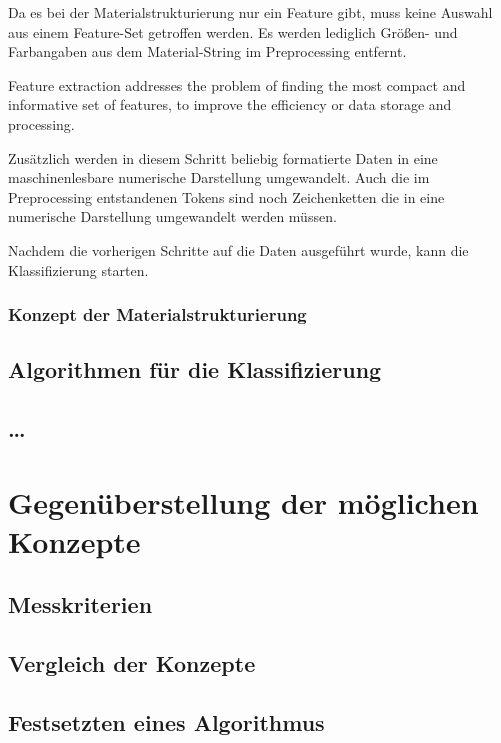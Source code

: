 Da es bei der Materialstrukturierung nur ein Feature gibt, muss keine Auswahl aus einem Feature-Set getroffen werden. Es werden lediglich Größen- und Farbangaben aus dem Material-String im Preprocessing entfernt.

\begin{definition}
	\label{d:feature-extraction}
	\glqq Feature extraction addresses the problem of finding the most compact and informative set of features, to improve the efficiency or data storage and processing.\grqq{} \citep{Guyon2006}
\end{definition}
Zusätzlich werden in diesem Schritt beliebig formatierte Daten in eine  maschinenlesbare numerische Darstellung umgewandelt. \citep{scit-learn_featureextraction} Auch die im Preprocessing entstandenen Tokens sind noch Zeichenketten die in eine numerische Darstellung umgewandelt werden müssen.

Nachdem die vorherigen Schritte auf die Daten ausgeführt wurde, kann die Klassifizierung starten.

\subsection{Konzept der Materialstrukturierung}
\section{Algorithmen für die Klassifizierung}
\section{\dots}


\chapter{Gegenüberstellung der möglichen Konzepte}
\label{c:comparison}
\section{Messkriterien}
\section{Vergleich der Konzepte}
\section{Festsetzten eines Algorithmus}


